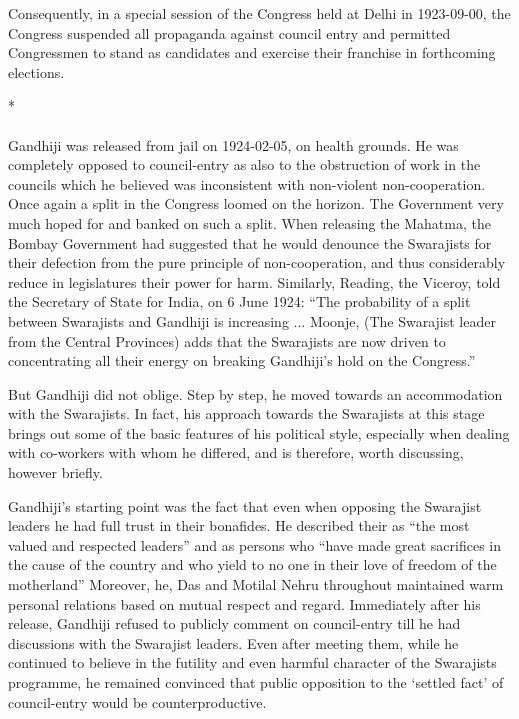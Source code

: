 \begin{multicols}{2}
Consequently, in a special session of the Congress held at Delhi in 1923-09-00, the Congress suspended all propaganda against council entry and permitted Congressmen to stand as candidates and exercise their franchise in forthcoming elections.

\begin{center}*\end{center}

\paragraph*{}
Gandhiji was released from jail on 1924-02-05, on health grounds. He was completely opposed to council-entry as also to the obstruction of work in the councils which he believed was inconsistent with non-violent non-cooperation. Once again a split in the Congress loomed on the horizon. The Government very much hoped for and banked on such a split. When releasing the Mahatma, the Bombay Government had suggested that he would denounce the Swarajists for their defection from the pure principle of non-cooperation, and thus considerably reduce in legislatures their power for harm. Similarly, Reading, the Viceroy, told the Secretary of State for India, on 6 June 1924: ``The probability of a split between Swarajists and Gandhiji is increasing ... Moonje, (The Swarajist leader from the Central Provinces) adds that the Swarajists are now driven to concentrating all their energy on breaking Gandhiji's hold on the Congress.''

But Gandhiji did not oblige. Step by step, he moved towards an accommodation with the Swarajists. In fact, his approach towards the Swarajists at this stage brings out some of the basic features of his political style, especially when dealing with co-workers with whom he differed, and is therefore, worth discussing, however briefly.

Gandhiji's starting point was the fact that even when opposing the Swarajist leaders he had full trust in their bonafides. He described their as ``the most valued and respected leaders'' and as persons who ``have made great sacrifices in the cause of the country and who yield to no one in their love of freedom of the motherland'' Moreover, he, Das and Motilal Nehru throughout maintained warm personal relations based on mutual respect and regard. Immediately after his release, Gandhiji refused to publicly comment on council-entry till he had discussions with the Swarajist leaders. Even after meeting them, while he continued to believe in the futility and even harmful character of the Swarajists programme, he remained convinced that public opposition to the `settled fact' of council-entry would be counterproductive.


\end{multicols}

